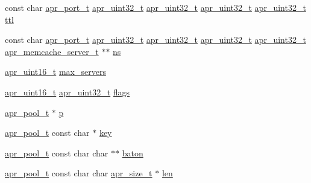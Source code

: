 \begin{DoxyCompactItemize}
\item 
const char \hyperlink{group__apr__network__io_gaa670a71960f6eb4fe0d0de2a1e7aba03}{apr\+\_\+port\+\_\+t} \hyperlink{group__apr__platform_ga558548a135d8a816c4787250744ea147}{apr\+\_\+uint32\+\_\+t} \hyperlink{group__apr__platform_ga558548a135d8a816c4787250744ea147}{apr\+\_\+uint32\+\_\+t} \hyperlink{group__apr__platform_ga558548a135d8a816c4787250744ea147}{apr\+\_\+uint32\+\_\+t} \hyperlink{group__apr__platform_ga558548a135d8a816c4787250744ea147}{apr\+\_\+uint32\+\_\+t} \hyperlink{group__APR__Util__MC_ga6e9eb567b7ddf19610db54e8c46cf78b}{ttl}
\item 
const char \hyperlink{group__apr__network__io_gaa670a71960f6eb4fe0d0de2a1e7aba03}{apr\+\_\+port\+\_\+t} \hyperlink{group__apr__platform_ga558548a135d8a816c4787250744ea147}{apr\+\_\+uint32\+\_\+t} \hyperlink{group__apr__platform_ga558548a135d8a816c4787250744ea147}{apr\+\_\+uint32\+\_\+t} \hyperlink{group__apr__platform_ga558548a135d8a816c4787250744ea147}{apr\+\_\+uint32\+\_\+t} \hyperlink{group__apr__platform_ga558548a135d8a816c4787250744ea147}{apr\+\_\+uint32\+\_\+t} \hyperlink{structapr__memcache__server__t}{apr\+\_\+memcache\+\_\+server\+\_\+t} $\ast$$\ast$ \hyperlink{group__APR__Util__MC_ga5529c7c3562faf89fa1c2f6104033406}{ns}
\item 
\hyperlink{group__apr__platform_ga3fb87c977e28a526d872d1081411b129}{apr\+\_\+uint16\+\_\+t} \hyperlink{group__APR__Util__MC_ga6d125da079a6df3cd41060e74d7b8616}{max\+\_\+servers}
\item 
\hyperlink{group__apr__platform_ga3fb87c977e28a526d872d1081411b129}{apr\+\_\+uint16\+\_\+t} \hyperlink{group__apr__platform_ga558548a135d8a816c4787250744ea147}{apr\+\_\+uint32\+\_\+t} \hyperlink{group__APR__Util__MC_gad1f784cc84e0ca7eb04ee77df95eb26a}{flags}
\item 
\hyperlink{structapr__pool__t}{apr\+\_\+pool\+\_\+t} $\ast$ \hyperlink{group__APR__Util__MC_ga2e727f881424334cf12d8af10f50ec6c}{p}
\item 
\hyperlink{structapr__pool__t}{apr\+\_\+pool\+\_\+t} const char $\ast$ \hyperlink{group__APR__Util__MC_gacd3d88da3c0e0313c3645ff34f62f542}{key}
\item 
\hyperlink{structapr__pool__t}{apr\+\_\+pool\+\_\+t} const char char $\ast$$\ast$ \hyperlink{group__APR__Util__MC_ga37840dc44e2b0b5a127a6828fffe2a8c}{baton}
\item 
\hyperlink{structapr__pool__t}{apr\+\_\+pool\+\_\+t} const char char \hyperlink{group__apr__platform_gaaa72b2253f6f3032cefea5712a27540e}{apr\+\_\+size\+\_\+t} $\ast$ \hyperlink{group__APR__Util__MC_gaec3bbc8c406590287ccd8d9613df4f8d}{len}

\end{DoxyCompactItemize}
